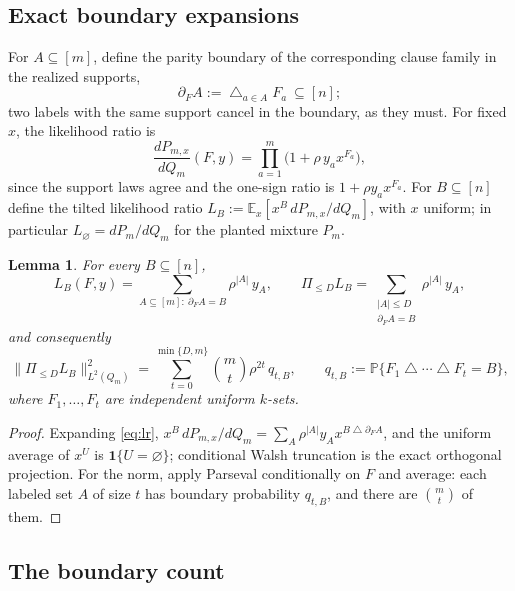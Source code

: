 \documentclass[11pt]{article}
\newtheorem{lemma}[lemma]{Lemma}
\theoremstyle{definition}
\theoremstyle{remark}
\newcommand{\E}{\mathbb E}
\newcommand{\bbP}{\mathbb P}
\newcommand{\1}{\mathbf 1}
\newcommand{\sd}{\mathbin{\triangle}}
\newcommand{\bigsd}{\mathop{\bigtriangleup}}
\numberwithin{equation}{section}
\begin{document}
\subsection{Exact boundary expansions}

For $A\subseteq[m]$, define the parity boundary of the corresponding
clause family in the realized supports,
\[
 \partial_FA:=\bigsd_{a\in A}F_a\ \subseteq[n];
\]
two labels with the same support cancel in the boundary, as they must.
For fixed $x$, the likelihood ratio is
\begin{equation}\label{eq:lr}
 \frac{dP_{m,x}}{dQ_m}(F,y)=\prod_{a=1}^m\bigl(1+\rho\,y_ax^{F_a}\bigr),
\end{equation}
since the support laws agree and the one-sign ratio is
$1+\rho y_ax^{F_a}$.  For $B\subseteq[n]$ define the tilted likelihood
ratio $L_B:=\E_x[x^B\,dP_{m,x}/dQ_m]$, with $x$ uniform; in particular
$L_\varnothing=dP_m/dQ_m$ for the planted mixture $P_m$.

\begin{lemma}\label{lem:boundary-lr}
For every $B\subseteq[n]$,
\begin{equation}\label{eq:boundary-expansion}
 L_B(F,y)=\sum_{A\subseteq[m]:\ \partial_FA=B}\rho^{|A|}\,y_A,
 \qquad
 \Pi_{\le D}L_B=\sum_{\substack{|A|\le D\\ \partial_FA=B}}
 \rho^{|A|}\,y_A,
\end{equation}
and consequently
\begin{equation}\label{eq:projection-norm}
 \bigl\|\Pi_{\le D}L_B\bigr\|_{L^2(Q_m)}^2
 =\sum_{t=0}^{\min\{D,m\}}\binom mt\rho^{2t}\,q_{t,B},
 \qquad
 q_{t,B}:=\bbP\{F_1\sd\cdots\sd F_t=B\},
\end{equation}
where $F_1,\ldots,F_t$ are independent uniform $k$-sets.
\end{lemma}
\begin{proof}
Expanding \cref{eq:lr},
$x^B\,dP_{m,x}/dQ_m=\sum_A\rho^{|A|}y_Ax^{B\sd\partial_FA}$, and the
uniform average of $x^U$ is $\1\{U=\varnothing\}$; conditional Walsh
truncation is the exact orthogonal projection.  For the norm, apply
Parseval conditionally on $F$ and average: each labeled set $A$ of size
$t$ has boundary probability $q_{t,B}$, and there are $\binom mt$ of
them.
\end{proof}

\subsection{The boundary count}
\end{document}

